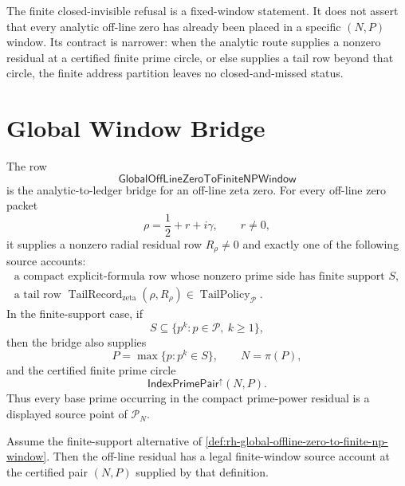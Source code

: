 \begin{principle}
\label{prin:rh-finite-window-obstruction-boundary}
The finite closed-invisible refusal is a fixed-window statement.  It
does not assert that every analytic off-line zero has already been
placed in a specific $(N,P)$ window.  Its contract is narrower: when
the analytic route supplies a nonzero residual at a certified finite
prime circle, or else supplies a tail row beyond that circle, the
finite address partition leaves no closed-and-missed status.
\end{principle}

\section{Global Window Bridge}
\label{sec:rh-global-offline-zero-finite-np-window}

\begin{definition}[GlobalOffLineZeroToFiniteNPWindow]
\label{def:rh-global-offline-zero-to-finite-np-window}
The row
$$
\mathsf{GlobalOffLineZeroToFiniteNPWindow}
$$
is the analytic-to-ledger bridge for an off-line zeta zero.  For every
off-line zero packet
$$
\rho=\frac12+r+i\gamma,
\qquad
r\ne0,
$$
it supplies a nonzero radial residual row $R_\rho\ne0$ and exactly one
of the following source accounts:
$$
\begin{gathered}
\text{a compact explicit-formula row whose nonzero prime side has
finite support }S,\\
\text{a tail row }
\operatorname{TailRecord}_{\mathrm{zeta}}(\rho,R_\rho)
\in
\operatorname{TailPolicy}_{\mathcal P}.
\end{gathered}
$$
In the finite-support case, if
$$
S\subseteq\{p^k:p\in\mathcal P,\ k\ge1\},
$$
then the bridge also supplies
$$
P=\max\{p:p^k\in S\},
\qquad
N=\pi(P),
$$
and the certified finite prime circle
$$
\mathsf{IndexPrimePair}^{\uparrow}(N,P).
$$
Thus every base prime occurring in the compact prime-power residual is
a displayed source point of $\mathcal P_N$.
\end{definition}

\begin{theorem}
\label{thm:rh-compact-explicit-formula-support-gives-finite-np-window}
Assume the finite-support alternative of
\autoref{def:rh-global-offline-zero-to-finite-np-window}.  Then the
off-line residual has a legal finite-window source account at the
certified pair $(N,P)$ supplied by that definition.
\end{theorem}

